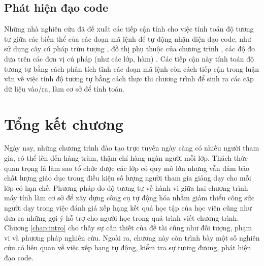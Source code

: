 
	
	
	
\subsection*{Phát hiện đạo code}

Những nhà nghiên cứu đã đề xuất các tiếp cận tính cho việc tính toán
độ tương tự giữa các biến thể của các đoạn mã lệnh để tự động nhận
diện đạo code, như sử dụng cây cú pháp trừu tượng
\cite{baxter1998clone}, đồ thị phụ thuộc của chương trình
\cite{komondoor2001using}, các độ đo dựa trên các đơn vị cú pháp (như
các lớp, hàm) \cite{dang2012xiao} \cite{merlo2004linear}. Các tiếp cận
này tính toán độ tương tự bằng cách phân tích tĩnh các đoạn mã lệnh
còn cách tiếp cận trong luận văn về việc tính độ tương tự bằng cách
thực thi chương trình để sinh ra các cặp dữ liệu vào/ra, làm cơ sở để
tính toán.
	
\section*{Tổng kết chương}

Ngày nay, những chương trình đào tạo trực tuyến ngày càng có nhiều
người tham gia, có thể lên đến hàng trăm, thậm chí hàng ngàn người mỗi
lớp. Thách thức quan trọng là làm sao tổ chức được các lớp có quy mô
lớn nhưng vẫn đảm bảo chất lượng giáo dục trong điều kiện số lượng
người tham gia giảng dạy cho mỗi lớp có hạn chế. Phương pháp đo độ
tương tự về hành vi giữa hai chương trình máy tính làm cơ sở để xây
dựng công cụ tự động hóa nhằm giảm thiểu công sức người dạy trong việc
đánh giá xếp hạng kết quả học tập của học viên cũng như đưa ra những
gợi ý hỗ trợ cho người học trong quá trình viết chương trình.
Chương \ref{chap:intro} cho thấy sự cần thiết của đề tài cũng như đối tượng, phạm vi và phương pháp nghiên cứu. Ngoài ra, chương này còn trình bày một số nghiên cứu có liên quan về việc xếp hạng tự động, kiểm tra sự tương đương, phát hiện đạo code.


